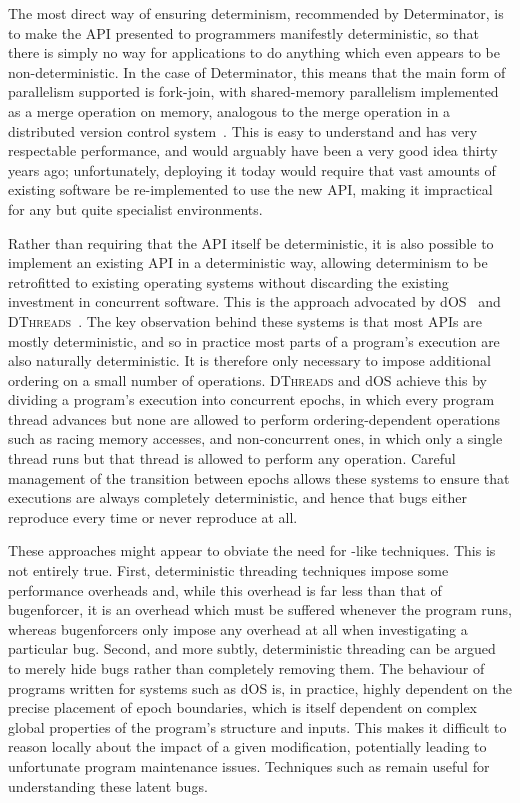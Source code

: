 The most direct way of ensuring determinism, recommended by
Determinator, is to make the API presented to programmers manifestly
deterministic, so that there is simply no way for applications to do
anything which even appears to be non-deterministic.  In the case of
Determinator, this means that the main form of parallelism supported
is fork-join, with shared-memory parallelism implemented as a merge
operation on memory, analogous to the merge operation in a distributed
version control system~\cite{FFFHamano2013}.  This is easy to
understand and has very respectable performance, and would arguably
have been a very good idea thirty years ago; unfortunately, deploying
it today would require that vast amounts of existing software be
re-implemented to use the new API, making it impractical for any but
quite specialist environments.

Rather than requiring that the API itself be deterministic, it is also
possible to implement an existing API in a deterministic way, allowing
determinism to be retrofitted to existing operating systems without
discarding the existing investment in concurrent software.  This is
the approach advocated by dOS~\cite{Bergan2010} and
\textsc{DThreads}~\cite{Liu2011}.  The key observation behind these
systems is that most APIs are mostly deterministic, and so in practice
most parts of a program's execution are also naturally deterministic.
It is therefore only necessary to impose additional ordering on a
small number of operations.  \textsc{DThreads} and dOS achieve this by
dividing a program's execution into concurrent epochs, in which every
program thread advances but none are allowed to perform
ordering-dependent operations such as racing memory accesses, and
non-concurrent ones, in which only a single thread runs but that
thread is allowed to perform any operation.  Careful management of the
transition between epochs allows these systems to ensure that
executions are always completely deterministic, and hence that bugs
either reproduce every time or never reproduce at all.

These approaches might appear to obviate the need for
{\technique}-like techniques.  This is not entirely true.  First,
deterministic threading techniques impose some performance overheads
and, while this overhead is far less than that of {\atechnique}
\gls{bugenforcer}, it is an overhead which must be suffered whenever
the program runs, whereas \glspl{bugenforcer} only impose any overhead
at all when investigating a particular bug.  Second, and more subtly,
deterministic threading can be argued to merely hide bugs rather than
completely removing them.  The behaviour of programs written for
systems such as dOS is, in practice, highly dependent on the precise
placement of epoch boundaries, which is itself dependent on complex
global properties of the program's structure and inputs.  This makes
it difficult to reason locally about the impact of a given
modification, potentially leading to unfortunate program maintenance
issues.  Techniques such as {\technique} remain useful for
understanding these latent bugs.

